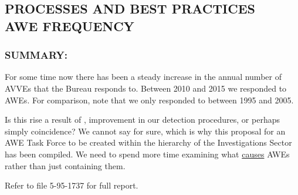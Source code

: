 \subsection*{PROCESSES AND BEST PRACTICES\\	AWE FREQUENCY}
\subsubsection*{SUMMARY:}
\par For some time now there has been a steady increase in the
annual number of AVVEs that the Bureau responds to. Between
2010 and 2015 we responded to  AWEs. For comparison, note that we only responded to  between 1995 and 2005.
\par Is this rise a result of , improvement in
our detection procedures, or perhaps simply coincidence? We
cannot say for sure, which is why this proposal for an AWE Task
Force to be created within the hierarchy of the Investigations
Sector has been compiled. We need to spend more time
examining what \ul{causes} AWEs rather than just containing them.
\par Refer to file 5-95-1737 for full report.